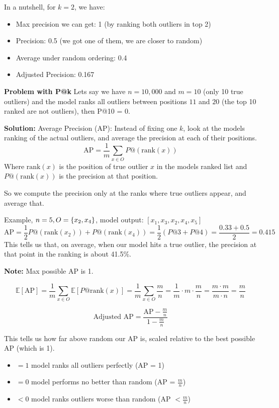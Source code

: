 \documentclass{article}
\begin{document}
In a nutshell, for $k=2$, we have:
\begin{itemize}
    \item Max precision we can get: 1 (by ranking both outliers in top 2)
    \item Precision: 0.5 (we got one of them, we are closer to random)
    \item Average under random ordering: 0.4 
    \item Adjusted Precision: 0.167
\end{itemize}

\textbf{Problem with P@k}
Lets say we have $n=10,000$ and $m=10$ (only 10 true outliers) and the model ranks all outliers between positions $11$ and $20$ (the top 10 ranked are not outliers), then P@10 = 0.

\textbf{Solution: }Average Precision (AP): Instead of fixing one $k$, look at the models ranking of the actual outliers, and average the precision at each of their positions.
\[
\text{AP} = \frac{1}{m} \sum_{x \in O}P@(\text{rank}(x))
\]
Where $\text{rank}(x)$ is the position of true outlier $x$ in the models ranked list and $P@(\text{rank}(x))$ is the precision at that position.

So we compute the precision only at the ranks where true outliers appear, and average that.

Example, $n=5, O=\{x_2, x_4\}$, model output: $[x_1,x_3, x_2, x_4, x_5]$ 
\[
\text{AP} = \frac{1}{2} P@(\text{rank}(x_2)) + P@(\text{rank}(x_4)) = \frac{1}{2} (P@3 + P@4) =\frac{0.33 +  0.5}{2} = 0.415  
\]
This tells us that, on average, when our model hits a true outlier, the precision at that point in the ranking is about 41.5\%.

\textbf{Note: }Max possible AP is 1.

\[
\mathbb{E}[\text{AP}] = \frac{1}{m} \sum_{x \in O} \mathbb{E}[P@\text{rank}(x)] =
\frac{1}{m} \sum_{x \in O} \frac{m}{n} =
\frac{1}{m} \cdot m \cdot \frac{m}{n} = 
\frac{m \cdot m}{m \cdot n} = \frac{m}{n}
\]

\[
\text{Adjusted AP} = \frac{\text{AP} - \frac{m}{n}}{1 - \frac{m}{n}}
\]

This tells us how far above random our AP is, scaled relative to the best possible AP (which is 1).
\begin{itemize}
    \item $= 1$ \quad model ranks all outliers perfectly (AP = 1)
    \item $= 0$ \quad model performs no better than random (AP = $\frac{m}{n}$)
    \item $< 0$ \quad model ranks outliers worse than random (AP  $<\frac{m}{n}$)
\end{itemize}
\end{document}
